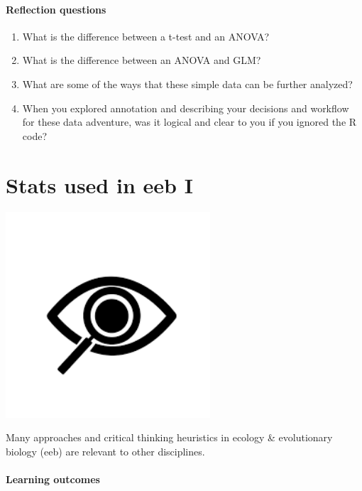 \documentclass[
]{book}
\providecommand{\tightlist}{%
  \setlength{\itemsep}{0pt}\setlength{\parskip}{0pt}}
\begin{document}
\hypertarget{reflection-questions-1}{%
\subsubsection*{Reflection questions}\label{reflection-questions-1}}

\begin{enumerate}
\def\labelenumi{\arabic{enumi}.}
\tightlist
\item
  What is the difference between a t-test and an ANOVA?\\
\item
  What is the difference between an ANOVA and GLM?\\
\item
  What are some of the ways that these simple data can be further analyzed?\\
\item
  When you explored annotation and describing your decisions and workflow for these data adventure, was it logical and clear to you if you ignored the R code?
\end{enumerate}

\hypertarget{eebI}{%
\chapter{Stats used in eeb I}\label{eebI}}

\includegraphics[width=3in,height=\textheight]{./eebI.png}

Many approaches and critical thinking heuristics in ecology \& evolutionary biology (eeb) are relevant to other disciplines.

\hypertarget{learning-outcomes-3}{%
\subsubsection*{Learning outcomes}\label{learning-outcomes-3}}
\end{document}
